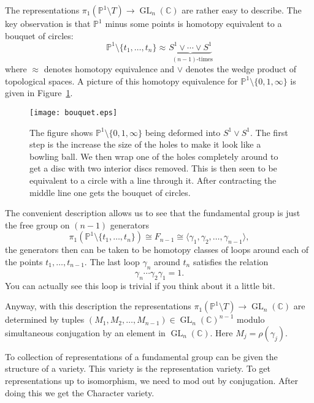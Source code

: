 \documentclass[12pt]{book}
\numberwithin{equation}{section}
\theoremstyle{definition}
\theoremstyle{remark}
\newcommand{\CC}{\mathbb{C}}
\newcommand{\PP}{\mathbb{P}}
\newcommand{\GL}{\operatorname{GL}}
\begin{document}
The representations $\pi_1(\PP^1\setminus T) \to \GL_n(\CC)$ are rather easy to describe. 
The key observation is that $\PP^1$ minus some points is homotopy equivalent to a bouquet of circles:
$$ \PP^1 \setminus \lbrace t_1,\ldots,t_n\rbrace \approx \underbrace{S^1 \vee \cdots \vee S^1}_{ \mbox{ $(n-1)$-times}}$$
where $\approx$ denotes homotopy equivalence and $\vee$ denotes the wedge product of topological spaces. 
A picture of this homotopy equivalence for $\PP^1 \setminus \lbrace 0,1,\infty\rbrace$ is given in Figure~\ref{F:bouquet}.
\begin{figure}[h]\label{F:bouquet}
	\begin{center}
		\texttt{[image: bouquet.eps]}
	\end{center}
	\caption{The figure shows $\PP^1\setminus \lbrace 0, 1, \infty\rbrace$ being deformed into $S^1 \vee S^1$. 
		The first step is the increase the size of the holes to make it look like a bowling ball. 
		We then wrap one of the holes completely around to get a disc with two interior discs removed. 
		This is then seen to be equivalent to a circle with a line through it. 
		After contracting the middle line one gets the bouquet of circles. 
	}
\end{figure}
The convenient description allows us to see that the fundamental group is just the free group on $(n-1)$ generators
$$\pi_1(\PP^1\setminus\lbrace t_1,\ldots,t_n\rbrace) \cong F_{n-1} \cong \langle \gamma_1,\gamma_2,\ldots,\gamma_{n-1} \rangle,$$ 
the generators then can be taken to be homotopy classes of loops around each of the points $t_1,\ldots, t_{n-1}$. 
The last loop $\gamma_n$ around $t_n$ satisfies the relation 
$$ \gamma_n \cdots \gamma_2 \gamma_1  = 1.$$
You can actually see this loop is trivial if you think about it a little bit. 

Anyway, with this description the representations $\pi_1(\PP^1\setminus T) \to \GL_n(\CC)$ are determined by tuples $(M_1,M_2,\ldots,M_{n-1}) \in \GL_n(\CC)^{n-1}$ modulo simultaneous conjugation by an element in $\GL_n(\CC)$.
Here $M_j = \rho(\gamma_j)$. 

To collection of representations of a fundamental group can be given the structure of a variety. 
This variety is the representation variety. 
To get representations up to isomorphism, we need to mod out by conjugation. 
After doing this we get the Character variety. 
\end{document}
